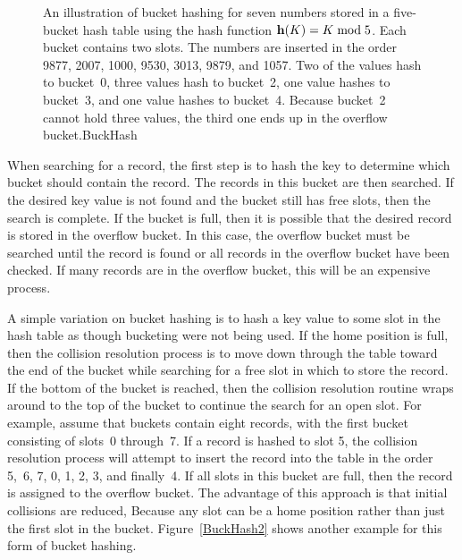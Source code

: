 \begin{figure}
\vspace{-\medskipamount}
{An illustration of bucket hashing for seven numbers stored in a
five-bucket hash table using the hash function
\( {\bf h}(K) = K \bmod 5\). 
Each bucket contains two slots.
The numbers are inserted in the order 9877, 2007, 1000, 9530, 3013,
9879, and 1057.
Two of the values hash to bucket~0, three values hash to bucket~2,
one value hashes to bucket~3,
and one value hashes to bucket~4.
Because bucket~2 cannot hold three values, the third one ends up in
the overflow bucket.}{BuckHash}
\medskip\medskip
\end{figure}

When searching for a record, the first step is to hash the key to
determine which bucket should contain the record.
The records in this bucket are then searched.
If the desired key value is not found and the bucket still has free
slots, then the search is complete.
If the bucket is full, then it is possible that the desired
record is stored in the overflow bucket.
In this case, the overflow bucket must be searched until the record is
found or all records in the overflow bucket have been checked.
If many records are in the overflow bucket, this will be an
expensive process.

A simple variation on bucket hashing is to hash a key value to some slot
in the hash table as though bucketing were not being used.
If the home position is full, then the collision resolution process is
to move down through the table toward the end of the bucket while
searching for a free slot in which to store the record.
If the bottom of the bucket is reached, then the collision
resolution routine wraps around to the top of the bucket to continue the
search for an open slot.
For example, assume that buckets contain eight records, with the first
bucket consisting of slots~0 through~7.
If a record is hashed to slot 5, the collision resolution process
will attempt to insert the record into the table in the order 5,~6, 7,
0, 1, 2, 3, and finally~4.
If all slots in this bucket are full, then the record is assigned
to the overflow bucket.
The advantage of this approach is that initial collisions are reduced,
Because any slot can be a home position rather than just the first
slot in the bucket.
Figure~\ref{BuckHash2} shows another example for this form of bucket
hashing.

